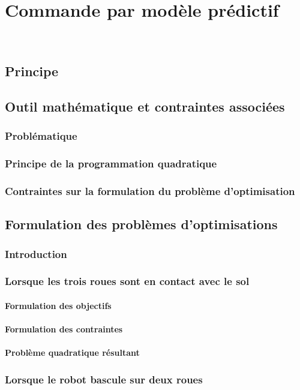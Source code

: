 \chapter{Commande par modèle prédictif}

	~

	\section{Principe}
	\section{Outil mathématique et contraintes associées}
		\subsection{Problématique}
		\subsection{Principe de la programmation quadratique}
		\subsection{Contraintes sur la formulation du problème d'optimisation}
	\section{Formulation des problèmes d'optimisations}
		\subsection{Introduction}
		\subsection{Lorsque les trois roues sont en contact avec le sol}
			\subsubsection{Formulation des objectifs}
			\subsubsection{Formulation des contraintes}
			\subsubsection{Problème quadratique résultant}
		\subsection{Lorsque le robot bascule sur deux roues}
